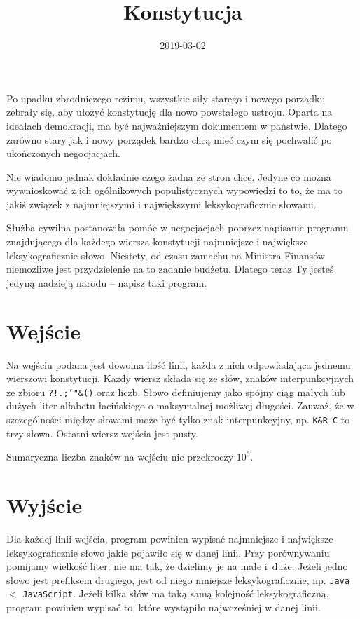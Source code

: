 \documentclass{sinol}
\title{Konstytucja}
\date{2019-03-02}
\begin{document}
\begin{tasktext}

Po upadku zbrodniczego reżimu, wszystkie siły starego i nowego porządku zebrały się, aby ułożyć  konstytucję dla nowo powstałego ustroju. Oparta na ideałach demokracji, ma być najważniejszym dokumentem w państwie.  Dlatego zarówno stary jak i nowy porządek bardzo chcą mieć czym się pochwalić po ukończonych negocjacjach.

Nie wiadomo jednak dokładnie czego żadna ze stron chce. Jedyne co można wywnioskować z ich ogólnikowych populistycznych wypowiedzi to to, że ma to jakiś związek z najmniejszymi i największymi leksykograficznie słowami.

Służba cywilna postanowiła pomóc w negocjacjach poprzez napisanie programu znajdującego dla każdego wiersza konstytucji najmniejsze i największe leksykograficznie słowo.  Niestety, od czasu zamachu na Ministra Finansów niemożliwe jest przydzielenie na to zadanie budżetu.  Dlatego teraz Ty jesteś jedyną nadzieją narodu -- napisz taki program.

\medskip

\section{Wejście}

Na wejściu podana jest dowolna ilość linii, każda z nich odpowiadająca jednemu wierszowi konstytucji. Każdy wiersz składa się ze słów, znaków interpunkcyjnych ze zbioru \texttt{?!.;'"\&()} oraz liczb. Słowo definiujemy jako spójny ciąg małych lub dużych liter alfabetu łacińskiego o maksymalnej możliwej długości.  Zauważ, że w szczególności między słowami może być tylko znak interpunkcyjny, np. \texttt{K\&R C} to trzy słowa. Ostatni wiersz wejścia jest pusty.

Sumaryczna liczba znaków na wejściu nie przekroczy $10^6$.

\medskip

\section{Wyjście}

Dla każdej linii wejścia, program powinien wypisać najmniejsze i największe leksykograficznie słowo jakie pojawiło się w danej linii.  Przy porównywaniu pomijamy wielkość liter: nie ma tak, że dzielimy je na małe i~duże.  Jeżeli jedno słowo jest prefiksem drugiego, jest od niego mniejsze leksykograficznie, np. \texttt{Java} $<$ \texttt{JavaScript}. Jeżeli kilka słów ma taką samą kolejność leksykograficzną, program powinien wypisać to, które wystąpiło najwcześniej w danej linii.


\end{tasktext}
\end{document}
